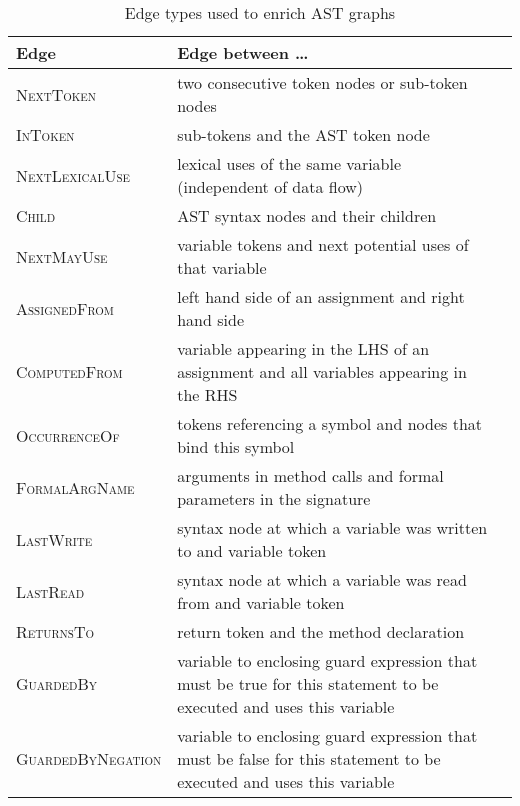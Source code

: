 \documentclass[sigconf,authordraft=true,nonacm=true]{acmart}
\begin{document}
\begin{table*}[t]
  \begin{tabularx}{\textwidth}{lXl}
    \toprule
    Edge & Edge between \ldots \\
    \midrule
    \textsc{NextToken} & two consecutive token nodes or sub-token nodes  \\
    \textsc{InToken} & sub-tokens and the AST token node \\
    \textsc{NextLexicalUse} & lexical uses of the same variable (independent of data flow) \\
    \textsc{Child} & AST syntax nodes and their children \\
    \textsc{NextMayUse} & variable tokens and next potential uses of that variable \\
    \textsc{AssignedFrom} & left hand side of an assignment and right hand side \\
    \textsc{ComputedFrom} & variable appearing in the LHS of an assignment and all variables appearing in the RHS\\
    \textsc{OccurrenceOf} & tokens referencing a symbol and nodes that bind this symbol \\
    \textsc{FormalArgName} & arguments in method calls and formal parameters in the signature \\
    \textsc{LastWrite} & syntax node at which a variable was written to and variable token \\
    \textsc{LastRead} & syntax node at which a variable was read from and variable token \\
    \textsc{ReturnsTo} & return token and the method declaration \\
    \textsc{GuardedBy} & variable to enclosing guard expression that must be true for this statement to be executed and uses this variable \\
    \textsc{GuardedByNegation} & variable to enclosing guard expression that must be false for this statement to be executed and uses this variable \\
    \bottomrule
  \end{tabularx}
  \caption{Edge types used to enrich AST graphs}\label{tbl:ast-edges}
\end{table*}
\end{document}
